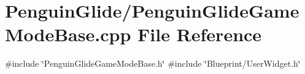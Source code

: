 \section{Penguin\+Glide/\+Penguin\+Glide\+Game\+Mode\+Base.cpp File Reference}
\label{_penguin_glide_game_mode_base_8cpp}
{\ttfamily \#include \char`\"{}Penguin\+Glide\+Game\+Mode\+Base.\+h\char`\"{}}\newline
{\ttfamily \#include \char`\"{}Blueprint/\+User\+Widget.\+h\char`\"{}}\newline
